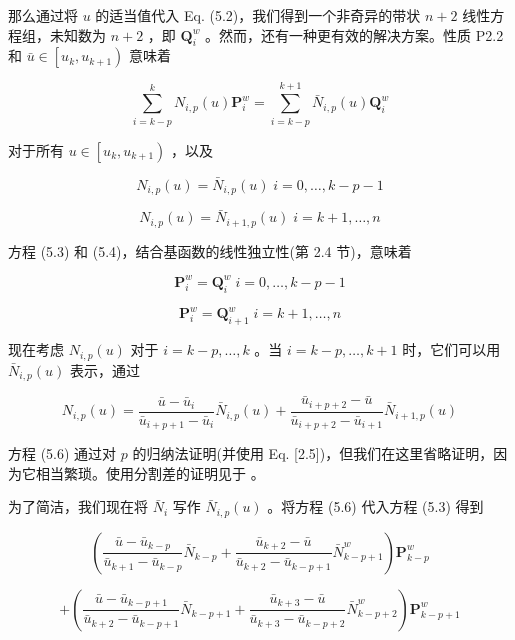 \documentclass[../main.tex]{subfiles}
\begin{document}
那么通过将 \(u\) 的适当值代入 Eq. (5.2)，我们得到一个非奇异的带状 \(n + 2\) 线性方程组，未知数为 \(n + 2\) ，即 \({\mathbf{Q}}_{i}^{w}\) 。然而，还有一种更有效的解决方案。性质 P2.2 和 \(\bar{u} \in  \left\lbrack  {{u}_{k},{u}_{k + 1}}\right)\) 意味着

\[
\mathop{\sum }\limits_{{i = k - p}}^{k}{N}_{i,p}\left( u\right) {\mathbf{P}}_{i}^{w} = \mathop{\sum }\limits_{{i = k - p}}^{{k + 1}}{\bar{N}}_{i,p}\left( u\right) {\mathbf{Q}}_{i}^{w} \tag{5.3}
\]

对于所有 \(u \in  \left\lbrack  {{u}_{k},{u}_{k + 1}}\right)\) ，以及

\[
{N}_{i,p}\left( u\right)  = {\bar{N}}_{i,p}\left( u\right) \;i = 0,\ldots ,k - p - 1
\]

\[
{N}_{i,p}\left( u\right)  = {\bar{N}}_{i + 1,p}\left( u\right) \;i = k + 1,\ldots ,n \tag{5.4}
\]

方程 (5.3) 和 (5.4)，结合基函数的线性独立性(第 2.4 节)，意味着

\[
{\mathbf{P}}_{i}^{w} = {\mathbf{Q}}_{i}^{w}\;i = 0,\ldots ,k - p - 1
\]

\[
{\mathbf{P}}_{i}^{w} = {\mathbf{Q}}_{i + 1}^{w}\;i = k + 1,\ldots ,n \tag{5.5}
\]

现在考虑 \({N}_{i,p}\left( u\right)\) 对于 \(i = k - p,\ldots ,k\) 。当 \(i = k - p,\ldots ,k + 1\) 时，它们可以用 \({\bar{N}}_{i,p}\left( u\right)\) 表示，通过

\[
{N}_{i,p}\left( u\right)  = \frac{\bar{u} - {\bar{u}}_{i}}{{\bar{u}}_{i + p + 1} - {\bar{u}}_{i}}{\bar{N}}_{i,p}\left( u\right)  + \frac{{\bar{u}}_{i + p + 2} - \bar{u}}{{\bar{u}}_{i + p + 2} - {\bar{u}}_{i + 1}}{\bar{N}}_{i + 1,p}\left( u\right)  \tag{5.6}
\]

方程 (5.6) 通过对 \(p\) 的归纳法证明(并使用 Eq. [2.5])，但我们在这里省略证明，因为它相当繁琐。使用分割差的证明见于 \cite{DeBo78,Boeh80,Lee83}。

为了简洁，我们现在将 \({\bar{N}}_{i}\) 写作 \({\bar{N}}_{i,p}\left( u\right)\) 。将方程 (5.6) 代入方程 (5.3) 得到

\[
\left( {\frac{\bar{u} - {\bar{u}}_{k - p}}{{\bar{u}}_{k + 1} - {\bar{u}}_{k - p}}{\bar{N}}_{k - p} + \frac{{\bar{u}}_{k + 2} - \bar{u}}{{\bar{u}}_{k + 2} - {\bar{u}}_{k - p + 1}}{\bar{N}}_{k - p + 1}^{w}}\right) {\mathbf{P}}_{k - p}^{w}
\]

\[
+ \left( {\frac{\bar{u} - {\bar{u}}_{k - p + 1}}{{\bar{u}}_{k + 2} - {\bar{u}}_{k - p + 1}}{\bar{N}}_{k - p + 1} + \frac{{\bar{u}}_{k + 3} - \bar{u}}{{\bar{u}}_{k + 3} - {\bar{u}}_{k - p + 2}}{\bar{N}}_{k - p + 2}^{w}}\right) {\mathbf{P}}_{k - p + 1}^{w}
\]
\end{document}
